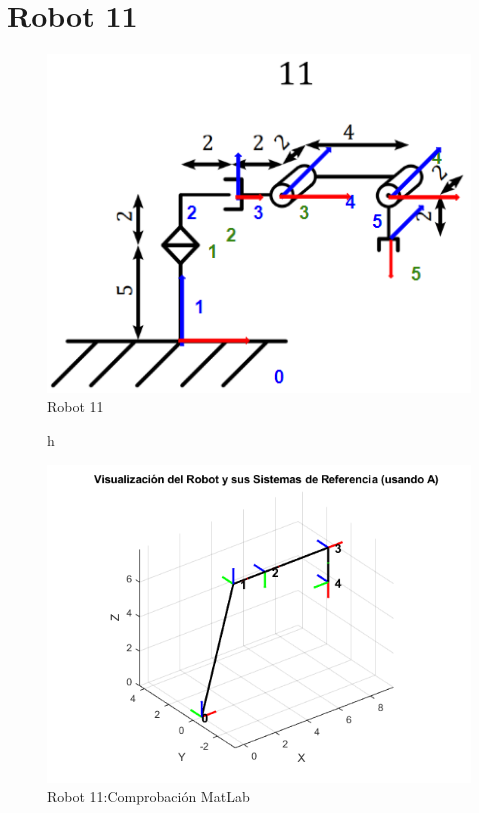 \section{Robot 11}
\begin{figure}[h]
	\centering
	{%
	\includegraphics[width=0.5\linewidth]{img/Diagrama11}
	\caption{Robot 11}
	\label{fig:diagrama11}
	}
\end{figure}
\begin{figure}{h}
	\centering
	{%
	\includegraphics[width=0.7\linewidth]{img/MatLab11}
	\caption{Robot 11:Comprobación MatLab}
	\label{fig:matlab11}
	}
\end{figure}
